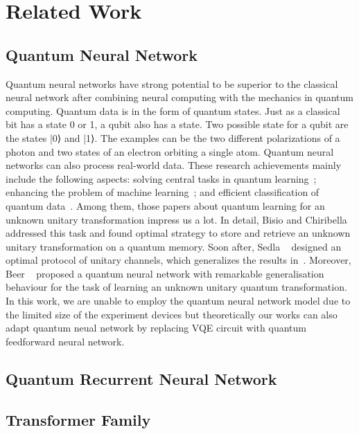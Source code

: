 \section{Related Work}

\subsection{Quantum Neural Network}
Quantum neural networks have strong potential to be superior to the classical neural network after combining neural computing with the mechanics in quantum computing. Quantum data is in the form of quantum states. Just as a classical bit has a state 0 or 1, a qubit also has a state. Two possible state for a qubit are the states |0⟩ and |1⟩. The examples can be the two different polarizations of a photon and two states of an electron orbiting a single atom. Quantum neural networks can also process real-world data. These research achievements mainly include the following aspects: solving central tasks in quantum learning~\cite{}; enhancing the problem of machine learning~\cite{}; and efficient classification of quantum data~\cite{}. Among them, those papers about quantum learning for an unknown unitary transformation impress us a lot. In detail, Bisio and Chiribella~\cite{} addressed this task and found optimal strategy to store and retrieve an unknown unitary transformation on a quantum memory. Soon after, Sedla \etal~\cite{} designed an optimal protocol of unitary channels, which generalizes the results in~\cite{}. Moreover, Beer \etal~\cite{} proposed a quantum neural network with remarkable generalisation behaviour for the task of learning an unknown unitary quantum transformation. In this work, we are unable to employ the quantum neural network model due to the limited size of the experiment devices but theoretically our works can also adapt quantum neual network by replacing VQE circuit with quantum feedforward neural network.

\subsection{Quantum Recurrent Neural Network}



\subsection{Transformer Family}

